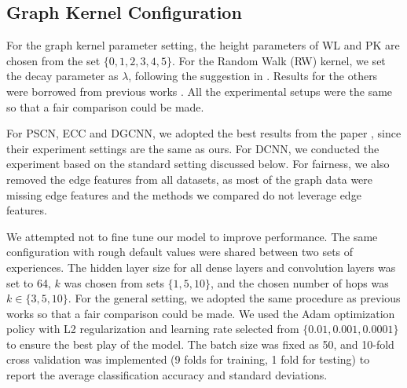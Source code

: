 \documentclass[conference]{IEEEtran}
\begin{document}
    \subsection{Graph Kernel Configuration} For the graph kernel parameter setting, the height parameters of WL and PK are chosen from the set $\lbrace0, 1, 2, 3, 4, 5 \rbrace$. For the Random Walk (RW) kernel, we set the decay parameter as $\lambda$, following the suggestion in \cite{shervashidze2011weisfeiler}. Results for the others were borrowed from previous works \cite{niepert2016learning,yanardag2015deep,zhang2018end}. All the experimental setups were the same so that a fair comparison could be made.
    
    For PSCN, ECC and DGCNN, we adopted the best results from the paper \cite{verma2018graph}, since their experiment settings are the same as ours. For DCNN, we conducted the experiment based on the standard setting discussed below. For fairness, we also removed the edge features from all datasets, as most of the graph data were missing edge features and the methods we compared do not leverage edge features.  
    
    We attempted not to fine tune our model to improve performance. The same configuration with rough default values were shared between two sets of experiences. The hidden layer size for all dense layers and convolution layers was set to 64, $k$ was chosen from sets $\lbrace 1, 5, 10 \rbrace$, and the chosen number of hops was $k \in \lbrace 3, 5, 10 \rbrace$. For the general setting, we adopted the same procedure as previous works \cite{zhang2018end} so that a fair comparison could be made. We used the Adam \cite{kingma2014adam} optimization policy with L2 regularization and learning rate selected from $\lbrace 0.01, 0.001, 0.0001 \rbrace$ to ensure the best play of the model. The batch size was fixed as 50, and 10-fold cross validation was implemented (9 folds for training, 1 fold for testing) to report the average classification accuracy and standard deviations.
	
\end{document}
